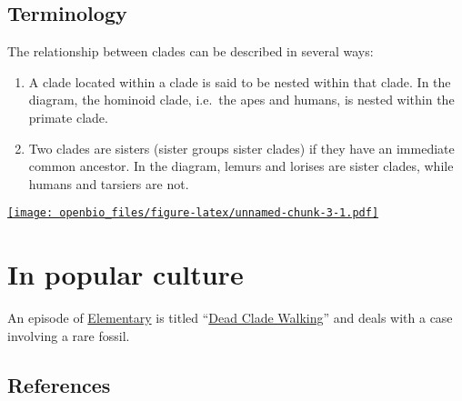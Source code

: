 \documentclass[
]{book}
\providecommand{\tightlist}{%
  \setlength{\itemsep}{0pt}\setlength{\parskip}{0pt}}
\begin{document}
\hypertarget{terminology}{%
\subsection{Terminology}\label{terminology}}

The relationship between clades can be described in several ways:

\begin{enumerate}
\def\labelenumi{\arabic{enumi}.}
\tightlist
\item
  A clade located within a clade is said to be nested within that clade. In the diagram, the hominoid clade, i.e.~the apes and humans, is nested within the primate clade.
\item
  Two clades are sisters (sister groups sister clades) if they have an immediate common ancestor. In the diagram, lemurs and lorises are sister clades, while humans and tarsiers are not.
\end{enumerate}

\href{https://upload.wikimedia.org/wikipedia/commons/thumb/5/5e/Primate_cladogram.svg/556px-Primate_cladogram.svg.png}{\texttt{[image: openbio\_files/figure-latex/unnamed-chunk-3-1.pdf]}}

\hypertarget{in-popular-culture}{%
\section{In popular culture}\label{in-popular-culture}}

An episode of \href{https://en.wikipedia.org/wiki/Elementary_(TV_series)}{Elementary} is titled ``\href{https://en.wikipedia.org/wiki/List_of_Elementary_episodes\#ep38}{Dead Clade Walking}'' and deals with a case involving a rare fossil.

\hypertarget{references}{%
\subsection{References}\label{references}}
\end{document}
